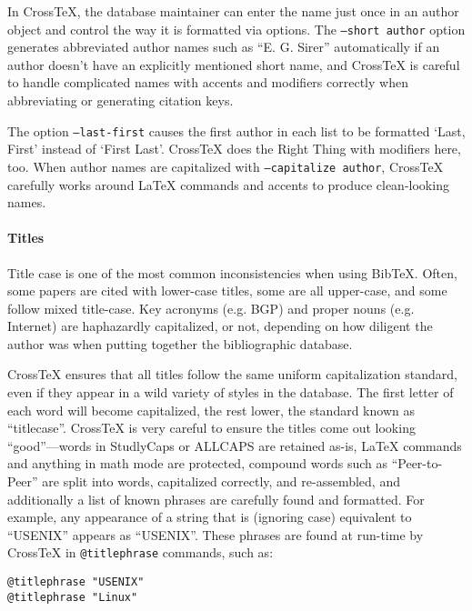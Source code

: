 \documentclass{article}
\newcommand{\XTeX}{Cross\TeX}
\begin{document}
In \XTeX{}, the database maintainer can enter the name just once in an
author object and control the way it is formatted via options. The
\texttt{--short author} option generates abbreviated author names such
as ``E. G. Sirer'' automatically if an author doesn't have an
explicitly mentioned short name, and \XTeX{} is careful to handle
complicated names with accents and modifiers correctly when
abbreviating or generating citation keys.

The option \texttt{--last-first} causes the first author in each list to be formatted `Last, First' instead of `First Last'.  \XTeX{} does the Right Thing with modifiers here, too.  When author names are capitalized with \texttt{--capitalize author}, \XTeX{} carefully works around \LaTeX{} commands and accents to produce clean-looking names.

\paragraph{Titles}

Title case is one of the most common inconsistencies when using
BibTeX. Often, some papers are cited with lower-case titles, some are
all upper-case, and some follow mixed title-case. Key acronyms
(e.g. BGP) and proper nouns (e.g. Internet) are haphazardly
capitalized, or not, depending on how diligent the author was when
putting together the bibliographic database.

\XTeX{} ensures that all titles follow the same uniform capitalization standard, even if they appear in a wild variety of styles in the database.  The first letter of each word will become capitalized, the rest lower, the standard known as ``titlecase''.  \XTeX{} is very careful to ensure the titles come out looking ``good''---words in StudlyCaps or ALLCAPS are retained as-is, \LaTeX{} commands and anything in math mode are protected, compound words such as ``Peer-to-Peer'' are split into words, capitalized correctly, and re-assembled, and additionally a list of known phrases are carefully found and formatted.  For example, any appearance of a string that is (ignoring case) equivalent to ``USENIX'' appears as ``USENIX''.  These phrases are found at run-time by \XTeX{} in \texttt{@titlephrase} commands, such as:

\begin{small}\begin{verbatim}
@titlephrase "USENIX"
@titlephrase "Linux"
\end{verbatim}\end{small}
\end{document}
